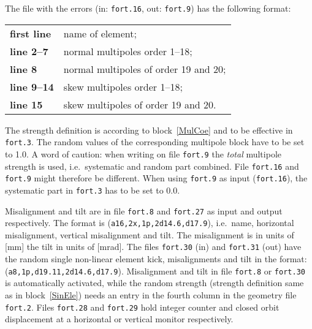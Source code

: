 The file with the errors (in: \texttt{fort.16}, out: \texttt{fort.9}) has the following format:

\bigskip
\begin{tabular}{ll}
    \textbf{first line} & name of element; \\
    \textbf{line 2--7}  & normal multipoles order 1--18; \\
    \textbf{line 8}     & normal multipoles of order 19 and 20; \\
    \textbf{line 9--14} & skew multipoles order 1--18; \\
    \textbf{line 15}    & skew multipoles of order 19 and 20.
\end{tabular}

\bigskip
The strength definition is according to block~\ref{MulCoe} and to be effective in \texttt{fort.3}.
The random values of the corresponding multipole block have to be set to 1.0.
A word of caution: when writing on file \texttt{fort.9} the \textit{total} multipole strength is used, i.e.\ systematic and random part combined.
File \texttt{fort.16} and \texttt{fort.9} might therefore be different.
When using \texttt{fort.9} as input (\texttt{fort.16}), the systematic part in \texttt{fort.3} has to be set to 0.0.

Misalignment and tilt are in file \texttt{fort.8} and \texttt{fort.27} as input and output respectively.
The format is (\texttt{a16,2x,1p,2d14.6,d17.9}), i.e.\ name, horizontal misalignment, vertical misalignment and tilt.
The misalignment is in units of [mm] the tilt in units of [mrad].
The files \texttt{fort.30} (in) and \texttt{fort.31} (out) have the random single non-linear element kick, misalignments and tilt in the format: (\texttt{a8,1p,d19.11,2d14.6,d17.9}).
Misalignment and tilt in file \texttt{fort.8} or \texttt{fort.30} is automatically activated, while the random strength (strength definition same as in block~\ref{SinEle}) needs an entry in the fourth column in the geometry file \texttt{fort.2}.
Files \texttt{fort.28} and \texttt{fort.29} hold integer counter and closed orbit displacement at a horizontal or vertical monitor respectively. 

 \setcounter{dst}{0}

